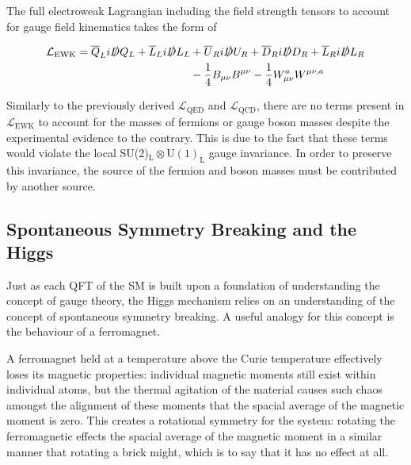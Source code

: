 \documentclass[12pt,a4paper,epsf,portrait,times,epsfig]{report}
\begin{document}
	The full electroweak Lagrangian including the field strength tensors to account for gauge field kinematics takes the form of

	\begin{equation}
		\begin{split}
		\mathcal{L}_{\mathrm{EWK}}=\overline{Q}_{L}i\slashed{D}Q_{L}+\overline{L}_{L}i\slashed{D}L_{L} &+ \overline{U}_{R}i\slashed{D}U_{R}+\overline{D}_{R}i\slashed{D}D_{R}+\overline{L}_{R}i\slashed{D}L_{R}\\
		&- \frac{1}{4}B_{\mu\nu}B^{\mu\nu}-\frac{1}{4}W_{\mu\nu}^{a}W^{\mu\nu,a}\\
		\end{split}
	\end{equation}

	Similarly to the previously derived $\mathcal{L}_{\mathrm{QED}}$ and $\mathcal{L}_{\mathrm{QCD}}$, there are no terms present in $\mathcal{L}_{\mathrm{EWK}}$ to account for the masses of fermions or gauge boson masses despite the experimental evidence to the contrary. This is due to the fact that these terms would violate the local SU(2)$_{\mathrm{L}} \otimes \mathrm{U(1)}_{\mathrm{L}}$ gauge invariance. In order to preserve this invariance, the source of the fermion and boson masses must be contributed by another source. 

	\subsection{Spontaneous Symmetry Breaking and the Higgs}


	Just as each QFT of the SM is built upon a foundation of understanding the concept of gauge theory, the Higgs mechanism relies on an understanding of the concept of spontaneous symmetry breaking. A useful analogy for this concept is the behaviour of a ferromagnet. \par

	A ferromagnet held at a temperature above the Curie temperature effectively loses its magnetic properties: individual magnetic moments still exist within individual atoms, but the thermal agitation of the material causes such chaos amongst the alignment of these moments that the spacial average of the magnetic moment is zero. This creates a rotational symmetry for the system: rotating the ferromagnetic effects the spacial average of the magnetic moment in a similar manner that rotating a brick might, which is to say that it has no effect at all. \par
	
\end{document}
